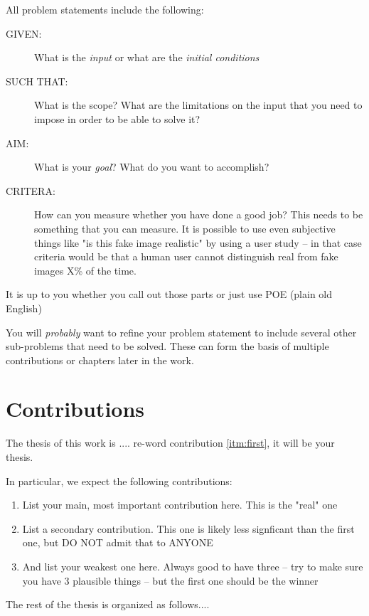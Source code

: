  All problem statements include the following:
 \begin{description}
     \item[GIVEN:] What is the \emph{input} or what are the \emph{initial conditions}
   \item[SUCH THAT:] What is the scope? What are the limitations on the input that
                you need to impose in order to be able to solve it?
   \item[AIM:] What is your \emph{goal}?   What do you want to accomplish?
   \item[CRITERA:]  How can you measure whether you have done a good job? This needs to
               be something that you can measure. It is possible to use even
               subjective things like "is this fake image realistic" by using
               a user study -- in that case criteria would be that
               a human user cannot distinguish real from fake images X\% of the time.
 \end{description}
 It is up to you whether you call out those parts or just use POE (plain old English)

  You will \emph{probably} want to refine your problem statement to include several other
  sub-problems that need to be solved.  These can form the basis of multiple contributions
  or chapters later in the work.

\section{Contributions} \label{sec:contributions}
The thesis of this work is ....
 re-word contribution \ref{itm:first}, it will be your thesis.

In particular, we
expect   %
the following contributions:
\begin{enumerate}
    \item \label{itm:first} List your main, most important contribution here. This is the "real" one
    \item  List a secondary contribution. This one is likely less signficant than the
           first one, but DO NOT admit that to ANYONE
    \item  And list your weakest one here. Always good to have three -- try to make sure
           you have 3 plausible things -- but the first one should be the winner
\end{enumerate}


The rest of the thesis is organized as follows....



